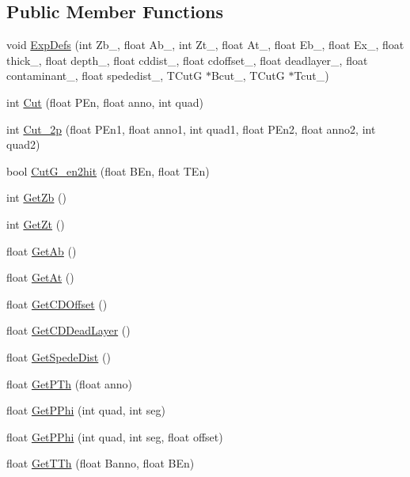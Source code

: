 \subsection*{Public Member Functions}
\begin{DoxyCompactItemize}
\item 
void \hyperlink{classdoppler_ac628277148db1641251745f86ba3dc52}{Exp\+Defs} (int Zb\+\_\+, float Ab\+\_\+, int Zt\+\_\+, float At\+\_\+, float Eb\+\_\+, float Ex\+\_\+, float thick\+\_\+, float depth\+\_\+, float cddist\+\_\+, float cdoffset\+\_\+, float deadlayer\+\_\+, float contaminant\+\_\+, float spededist\+\_\+, T\+CutG $\ast$Bcut\+\_\+, T\+CutG $\ast$Tcut\+\_\+)
\item 
int \hyperlink{classdoppler_aa3debb227d73f7cdea5b02e4c202cb19}{Cut} (float P\+En, float anno, int quad)
\item 
int \hyperlink{classdoppler_a52f116733da78465469a75ced66915a8}{Cut\+\_\+2p} (float P\+En1, float anno1, int quad1, float P\+En2, float anno2, int quad2)
\item 
bool \hyperlink{classdoppler_a56df9f9384f469385458193754c743c9}{Cut\+G\+\_\+en2hit} (float B\+En, float T\+En)
\item 
int \hyperlink{classdoppler_a29e9a1565d90df9f5d9deef05cdbf53c}{Get\+Zb} ()
\item 
int \hyperlink{classdoppler_ac0587ca2b963edec86d17dd6dac024ce}{Get\+Zt} ()
\item 
float \hyperlink{classdoppler_ac3cde63421ff794992231027245ceced}{Get\+Ab} ()
\item 
float \hyperlink{classdoppler_a72bb0dc1707c0f2bf4b978caf06f2cf1}{Get\+At} ()
\item 
float \hyperlink{classdoppler_ac7725720fab82af5a5a6f02041bc9483}{Get\+C\+D\+Offset} ()
\item 
float \hyperlink{classdoppler_a2c1aef6db4ad3fc0c98e91d995992706}{Get\+C\+D\+Dead\+Layer} ()
\item 
float \hyperlink{classdoppler_ae45abdba9f375009cdeba5ac81d7b32c}{Get\+Spede\+Dist} ()
\item 
float \hyperlink{classdoppler_a1415bdb47dbb9d5eba7f14a64bd3693e}{Get\+P\+Th} (float anno)
\item 
float \hyperlink{classdoppler_a0f57a8f4a8c369c14d52e62dd3833f2e}{Get\+P\+Phi} (int quad, int seg)
\item 
float \hyperlink{classdoppler_ac8f059cc77214a954be534a85c748a3c}{Get\+P\+Phi} (int quad, int seg, float offset)
\item 
float \hyperlink{classdoppler_a7865dcf92a6b18d23cb48e9e624e505b}{Get\+T\+Th} (float Banno, float B\+En)

\end{DoxyCompactItemize}
